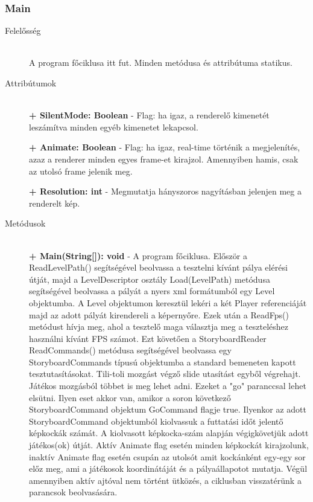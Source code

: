 \subsubsection{Main}
	\begin{description}
		\item[Felelősség] \hfill \\
		A program főciklusa itt fut. Minden metódusa és attribútuma statikus.

		\item[Attribútumok] \hfill \\
		\textbf{+ SilentMode: Boolean} - Flag: ha igaz, a renderelő kimenetét leszámítva minden egyéb kimenetet lekapcsol.

		\textbf{+ Animate: Boolean} - Flag: ha igaz, real-time történik a megjelenítés, azaz a renderer minden egyes frame-et kirajzol. Amennyiben hamis, csak az utolsó frame jelenik meg.

		\textbf{+ Resolution: int} - Megmutatja hányszoros nagyításban jelenjen meg a renderelt kép.

		\item[Metódusok] \hfill \\
		\textbf{+ Main(String[]): void} - A program főciklusa. Először a ReadLevelPath() segítségével beolvassa a tesztelni kívánt pálya elérési útját, majd a LevelDescriptor osztály Load(LevelPath) metódusa segítségével beolvassa a pályát a nyers xml formátumból egy Level objektumba. A Level objektumon keresztül lekéri a két Player referenciáját majd az adott pályát kirendereli a képernyőre. Ezek után a ReadFps() metódust hívja meg, ahol a tesztelő maga választja meg a teszteléshez használni kívánt FPS számot. Ezt követően a StoryboardReader ReadCommands() metódusa segítségével beolvassa egy StoryboardCommands típusú objektumba a standard bemeneten kapott tesztutasításokat. Tili-toli mozgást végző slide utasítást egyből végrehajt. Játékos mozgásból többet is meg lehet adni. Ezeket a "go" paranccsal lehet elsütni. Ilyen eset akkor van, amikor a soron következő StoryboardCommand objektum GoCommand flagje true. Ilyenkor az adott StoryboardCommand objektumból kiolvassuk a futtatási időt jelentő képkockák számát. A kiolvasott képkocka-szám alapján végigkövetjük adott játékos(ok) útját. Aktív Animate flag esetén minden képkockát kirajzolunk, inaktív Animate flag esetén csupán az utolsót amit kockánként egy-egy sor előz meg, ami a játékosok koordinátáját és a pályaállapotot mutatja. Végül amennyiben aktív ajtóval nem történt ütközés, a ciklusban visszatérünk a parancsok beolvasására.


\end{description}
